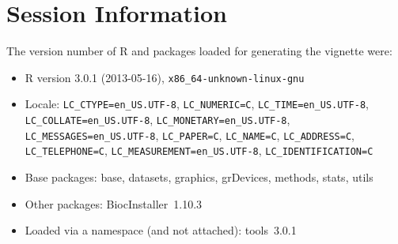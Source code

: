 \documentclass[11pt,a4paper]{article}
\begin{document}
\clearpage

\section*{Session Information}

The version number of R and packages loaded for generating the vignette were:


\begin{itemize}\raggedright
  \item R version 3.0.1 (2013-05-16), \verb|x86_64-unknown-linux-gnu|
  \item Locale: \verb|LC_CTYPE=en_US.UTF-8|, \verb|LC_NUMERIC=C|, \verb|LC_TIME=en_US.UTF-8|, \verb|LC_COLLATE=en_US.UTF-8|, \verb|LC_MONETARY=en_US.UTF-8|, \verb|LC_MESSAGES=en_US.UTF-8|, \verb|LC_PAPER=C|, \verb|LC_NAME=C|, \verb|LC_ADDRESS=C|, \verb|LC_TELEPHONE=C|, \verb|LC_MEASUREMENT=en_US.UTF-8|, \verb|LC_IDENTIFICATION=C|
  \item Base packages: base, datasets, graphics, grDevices, methods,
    stats, utils
  \item Other packages: BiocInstaller~1.10.3
  \item Loaded via a namespace (and not attached): tools~3.0.1
\end{itemize}
\end{document}

